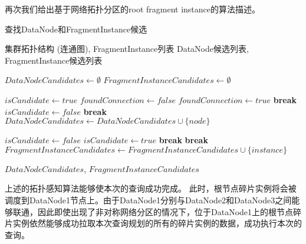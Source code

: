 再次我们给出基于网络拓扑分区的root fragment instance的算法描述。
\begin{algorithm}
  \caption{查找DataNode和FragmentInstance候选}
  \label{alg:find_candidates}
  \begin{algorithmic}
  \REQUIRE 集群拓扑结构 (连通图), FragmentInstance列表
  \ENSURE DataNode候选列表, FragmentInstance候选列表
  
  \STATE $DataNodeCandidates \leftarrow \emptyset$
  \STATE $FragmentInstanceCandidates \leftarrow \emptyset$
  
      \STATE $isCandidate \leftarrow true$
          \STATE $foundConnection \leftarrow false$
                  \STATE $foundConnection \leftarrow true$
                  \STATE \textbf{break} 
              \ENDIF
          \ENDFOR
              \STATE $isCandidate \leftarrow false$
              \STATE \textbf{break} 
          \ENDIF
      \ENDFOR
          \STATE $DataNodeCandidates \leftarrow DataNodeCandidates \cup \{node\}$
      \ENDIF
  \ENDFOR
  
      \STATE $isCandidate \leftarrow false$
                  \STATE $isCandidate \leftarrow true$
                  \STATE \textbf{break} 
              \ENDIF
          \ENDFOR
              \STATE \textbf{break} 
          \ENDIF
      \ENDFOR
          \STATE $FragmentInstanceCandidates \leftarrow FragmentInstanceCandidates \cup \{instance\}$
      \ENDIF
  \ENDFOR
  
  \RETURN $DataNodeCandidates$, $FragmentInstanceCandidates$
  \end{algorithmic}
  \end{algorithm}

上述的拓扑感知算法能够使本次的查询成功完成。
此时，根节点碎片实例将会被调度到DataNode1节点上。由于DataNode1分别与DataNode2和DataNode3之间能够联通，因此即使出现了非对称网络分区的情况下，位于DataNode1上的根节点碎片实例依然能够成功拉取本次查询规划的所有的碎片实例的数据，成功执行本次的查询。


